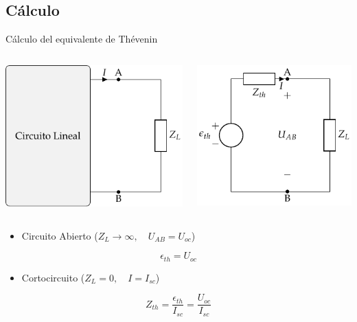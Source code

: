 \documentclass[aspectratio=169, usenames,svgnames,dvipsnames]{beamer}
\begin{document}
\subsection{Cálculo}
\label{sec:orgaa48b35}
\begin{frame}[label={sec:org1551971}]{Cálculo del equivalente de Thévenin}
\begin{columns}
\begin{column}{0.5\columnwidth}
\begin{center}
\includegraphics[height=0.38\textheight]{../figs/CircuitoLineal_ZL.pdf}
\end{center}
\end{column}

\begin{column}{0.5\columnwidth}
\begin{center}
\includegraphics[height=0.38\textheight]{../figs/EquivalenteThevenin.pdf}
\end{center}
\end{column}
\end{columns}


\begin{itemize}
\item Circuito Abierto (\(Z_L \to \infty, \quad U_{AB} = U_{oc}\))
\end{itemize}
\[
\boxed{\epsilon_{th} = U_{oc}}
\]
\begin{itemize}
\item Cortocircuito (\(Z_L = 0, \quad I = I_{sc}\))
\end{itemize}
\[
\boxed{Z_{th} = \frac{\epsilon_{th}}{I_{sc}} = \frac{U_{oc}}{I_{sc}}}
\]
\end{frame}
\end{document}

